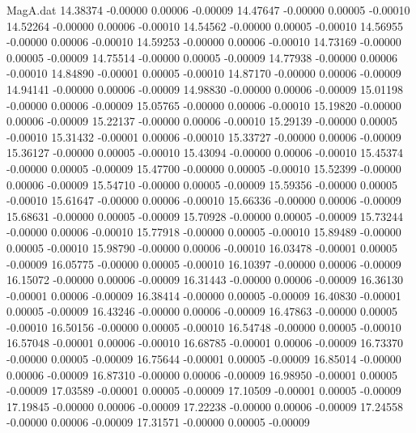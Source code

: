 \begin{filecontents}{MagA.dat}
  14.38374   -0.00000    0.00006   -0.00009
  14.47647   -0.00000    0.00005   -0.00010
  14.52264   -0.00000    0.00006   -0.00010
  14.54562   -0.00000    0.00005   -0.00010
  14.56955   -0.00000    0.00006   -0.00010
  14.59253   -0.00000    0.00006   -0.00010
  14.73169   -0.00000    0.00005   -0.00009
  14.75514   -0.00000    0.00005   -0.00009
  14.77938   -0.00000    0.00006   -0.00010
  14.84890   -0.00001    0.00005   -0.00010
  14.87170   -0.00000    0.00006   -0.00009
  14.94141   -0.00000    0.00006   -0.00009
  14.98830   -0.00000    0.00006   -0.00009
  15.01198   -0.00000    0.00006   -0.00009
  15.05765   -0.00000    0.00006   -0.00010
  15.19820   -0.00000    0.00006   -0.00009
  15.22137   -0.00000    0.00006   -0.00010
  15.29139   -0.00000    0.00005   -0.00010
  15.31432   -0.00001    0.00006   -0.00010
  15.33727   -0.00000    0.00006   -0.00009
  15.36127   -0.00000    0.00005   -0.00010
  15.43094   -0.00000    0.00006   -0.00010
  15.45374   -0.00000    0.00005   -0.00009
  15.47700   -0.00000    0.00005   -0.00010
  15.52399   -0.00000    0.00006   -0.00009
  15.54710   -0.00000    0.00005   -0.00009
  15.59356   -0.00000    0.00005   -0.00010
  15.61647   -0.00000    0.00006   -0.00010
  15.66336   -0.00000    0.00006   -0.00009
  15.68631   -0.00000    0.00005   -0.00009
  15.70928   -0.00000    0.00005   -0.00009
  15.73244   -0.00000    0.00006   -0.00010
  15.77918   -0.00000    0.00005   -0.00010
  15.89489   -0.00000    0.00005   -0.00010
  15.98790   -0.00000    0.00006   -0.00010
  16.03478   -0.00001    0.00005   -0.00009
  16.05775   -0.00000    0.00005   -0.00010
  16.10397   -0.00000    0.00006   -0.00009
  16.15072   -0.00000    0.00006   -0.00009
  16.31443   -0.00000    0.00006   -0.00009
  16.36130   -0.00001    0.00006   -0.00009
  16.38414   -0.00000    0.00005   -0.00009
  16.40830   -0.00001    0.00005   -0.00009
  16.43246   -0.00000    0.00006   -0.00009
  16.47863   -0.00000    0.00005   -0.00010
  16.50156   -0.00000    0.00005   -0.00010
  16.54748   -0.00000    0.00005   -0.00010
  16.57048   -0.00001    0.00006   -0.00010
  16.68785   -0.00001    0.00006   -0.00009
  16.73370   -0.00000    0.00005   -0.00009
  16.75644   -0.00001    0.00005   -0.00009
  16.85014   -0.00000    0.00006   -0.00009
  16.87310   -0.00000    0.00006   -0.00009
  16.98950   -0.00001    0.00005   -0.00009
  17.03589   -0.00001    0.00005   -0.00009
  17.10509   -0.00001    0.00005   -0.00009
  17.19845   -0.00000    0.00006   -0.00009
  17.22238   -0.00000    0.00006   -0.00009
  17.24558   -0.00000    0.00006   -0.00009
  17.31571   -0.00000    0.00005   -0.00009

\end{filecontents}
